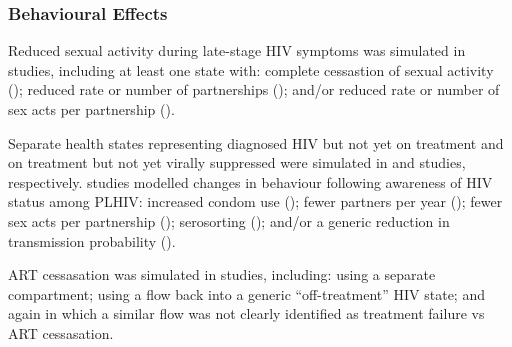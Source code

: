 \subsubsection{Behavioural Effects} %
\label{sss:res:beh}
Reduced sexual activity during late-stage HIV symptoms was simulated in  studies,
including at least one state with:
complete cessastion of sexual activity ();
reduced rate or number of partnerships (); and/or
reduced rate or number of sex acts per partnership ().
\par
Separate health states representing diagnosed HIV but not yet on treatment
and on treatment but not yet virally suppressed were simulated in
 and  studies, respectively.
 studies modelled changes in behaviour following awareness of HIV status among PLHIV:
increased condom use ();
fewer partners per year ();
fewer sex acts per partnership ();
serosorting (); and/or
a generic reduction in transmission probability ().
\par
ART cessasation was simulated in  studies, including:  %
 using a separate compartment; %
 using a flow back into a generic ``off-treatment'' HIV state; and again %
 in which a similar flow was not clearly identified as treatment failure vs ART cessasation.  %
